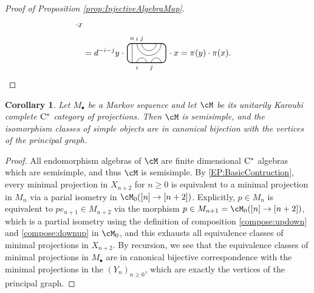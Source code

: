 \documentclass[11pt]{article}
\theoremstyle{plain}
\newtheorem{cor}[thm]{Corollary}
\theoremstyle{definition}
\newcommand{\Cstar}{\rm{C^*}}
\newcommand{\TLCapJoin}[5]{
 \TLTStart
 \TLTThrough{#1}
 \TLTCapJoin{#2}{#3}{#4}{#5}
 \TLTEnd
}
\newcommand{\TLTCalcLabelOffset}[3][0cm]{
 \settowidth{#2}{\scriptsize{$#3$}}
 \setlength{#2}{.5#2}
 \setlength{#2}{\maxof{#2}{#1}}
}
\newcommand{\TLTEnd}{
 \draw[thick, rounded corners = 5pt] (0,0) rectangle ($ (TLTlead) + (0,.8) $);
 \end{tikzpicture}
}
\newcommand{\TLTStart}{
 \begin{tikzpicture}[baseline=.3cm]
 \coordinate (TLTlead) at (.2,0); %
 \let\TLTlabelwidth\relax
 \newlength{\TLTlabelwidth}
}
\newcommand{\TLTThrough}[1]{
 \TLTCalcLabelOffset[.2cm]{\TLTlabelwidth}{#1}
 \coordinate (TLTlead) at ($ (TLTlead) + ({\TLTlabelwidth},0) $);
 \begin{scope}[shift=(TLTlead)]
  \draw (0,0) -- (0,.8);
  \node at (0,1) {\scriptsize{$#1$}};
 \end{scope}
  \coordinate (TLTlead) at ($ (TLTlead) + ({\TLTlabelwidth},0) $);
}
\newcommand{\TLTCapcup}[1]{
 \TLTCalcLabelOffset[.2cm]{\TLTlabelwidth}{#1}
  \coordinate (TLTlead) at ($ (TLTlead) + ({\TLTlabelwidth},0) $);
 \begin{scope}[shift=(TLTlead)]
  \draw (0,0) arc (180:0:.2);
  \draw (0,.8) arc (-180:0:.2);
  \node at (0,1) {\scriptsize{$#1$}};
 \end{scope}
 \TLTCalcLabelOffset[.5cm]{\TLTlabelwidth}{#1}
 \coordinate (TLTlead) at ($ (TLTlead) + ({\TLTlabelwidth},0)$);
}
\newcommand{\TLTCapJoin}[4]{
 \let\TLTjoinlwidth\relax
 \newlength{\TLTjoinlwidth}
 \let\TLTjoinrwidth\relax
 \newlength{\TLTjoinrwidth}
 \let\TLTsplitlwidth\relax
 \newlength{\TLTsplitlwidth}
 \let\TLTsplitrwidth\relax
 \newlength{\TLTsplitrwidth}
 \TLTCalcLabelOffset[.8cm]{\TLTjoinrwidth}{#4} %
 \TLTCalcLabelOffset[.15cm]{\TLTjoinlwidth}{#3} %
 \TLTCalcLabelOffset[.6cm]{\TLTsplitlwidth}{#1}
 \TLTCalcLabelOffset[.6cm]{\TLTsplitrwidth}{#2}
 \setlength{\TLTlabelwidth}{\maxof{\TLTjoinlwidth}{\TLTsplitlwidth}}
 \coordinate (TLTlead) at ($ (TLTlead) + ({\TLTlabelwidth},0) $);
 \setlength{\TLTlabelwidth}{\maxof{\TLTjoinrwidth}{\TLTsplitrwidth}} %
 \begin{scope}[shift=(TLTlead)]
  \draw (0,.8) arc (-180:0:.5);
  \draw (0.2,.8) arc (-180:0:.3);
  \draw (0,0) arc (180:0:.2);
  \draw ({\TLTsplitlwidth},0) arc (180:0:.2);
  \node at (0,1) {\scriptsize{$#4$}};
  \node at ({\TLTjoinlwidth},1) {\scriptsize{$#3$}};
  \node at (0,-.2) {\scriptsize{$#1$}};
  \node at ({\TLTsplitlwidth},-.2) {\scriptsize{$#2$}};
 \end{scope}
 \coordinate (TLTlead) at ($ (TLTlead) + ({\TLTlabelwidth},0) $);
}
\begin{document}
\begin{proof}[Proof of Proposition \ref{prop:InjectiveAlgebraMap}]
\begin{align*}
\cdot x %
\\&= 
d^{-i-j}
y\cdot\, 
 \begin{tikzpicture}[baseline=.3cm]
  \draw (.2,0) -- (.2,.8);
  \node at (.2,1) {\scriptsize{$n$}};
  \draw (.4,0) arc (180:0:.2cm);
  \node at (.4,-.2) {\scriptsize{$i$}};
  \draw (1,0) arc (180:0:.2cm);
  \node at (1,-.2) {\scriptsize{$j$}};
  \draw (.4,.8) arc (-180:0:.5cm);
  \node at (.4,1) {\scriptsize{$i$}};
  \draw (.6,.8) arc (-180:0:.3cm);
  \node at (.6,1) {\scriptsize{$j$}};
  \draw[thick, rounded corners = 5pt] (0,0) rectangle (1.6,.8);
 \end{tikzpicture}
\,\cdot x
=
\pi(y)\cdot \pi(x).
\qedhere
\end{align*}
\end{proof}

\begin{cor}
\label{cor:SemisimpleProjectionCategory}
Let $M_\bullet$ be a Markov sequence and let $\cM$ be its unitarily Karoubi complete $\Cstar$ category of projections.
Then $\cM$ is semisimple, and the isomorphism classes of simple objects are in canonical bijection with the vertices of the principal graph.
\end{cor}
\begin{proof}
All endomorphism algebras of $\cM$ are finite dimensional $\Cstar$ algebras which are semisimple, and thus $\cM$ is semisimple. By \ref{EP:BasicContruction}, every minimal projection in $X_{n+2}$ for $n\geq 0$ is equivalent to a minimal projection in $M_{n}$ via a parial isometry in $\cM_0([n] \to [n+2])$. 
Explicitly, $p\in M_n$ is equivalent to $p e_{n+1} \in M_{n+2}$ via the morphism $p\in M_{n+1} = \cM_0([n] \to [n+2])$, which is a partial isometry using the definition of composition \ref{compose:updown} and \ref{compose:downup} in $\cM_0$, and this exhausts all equivalence classes of minimal projections in $X_{n+2}$.
By recursion, we see that the equivalence classes of minimal projections in $M_\bullet$ are in canonical bijective correspondence with the minimal projections in the $(Y_n)_{n\geq 0}$, which are exactly the vertices of the principal graph.
\end{proof}
\end{document}
